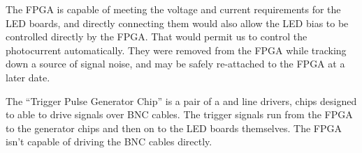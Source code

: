 The FPGA is capable of meeting the voltage and current requirements for the LED boards, and directly connecting them would also allow the LED bias to be controlled directly by the FPGA.  That would permit us to control the photocurrent automatically.  They were removed from the FPGA while tracking down a source of signal noise, and may be safely re-attached to the FPGA at a later date.

The ``Trigger Pulse Generator Chip'' is a pair of a  and  line drivers, chips designed to able to drive signals over BNC cables.  The trigger signals run from the FPGA to the generator chips and then on to the LED boards themselves.  The FPGA isn't capable of driving the BNC cables directly.


